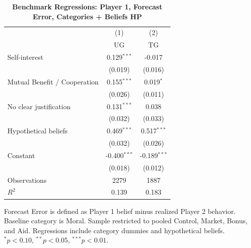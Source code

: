 \begin{table}[!htbp]
\centering
\caption{\textbf{Benchmark Regressions: Player 1, Forecast Error, Categories + Beliefs HP}}
\label{tab:cats_hp_cats_hp_fe_regs}
\begin{tabular}{lcc}
\toprule
 & (1) & (2) \\
 & UG & TG \\
\midrule
Self-interest & 0.129$^{***}$ & -0.017 \\
 & (0.019) & (0.016) \\
Mutual Benefit / Cooperation & 0.155$^{***}$ & 0.019$^{*}$ \\
 & (0.026) & (0.011) \\
No clear justification & 0.131$^{***}$ & 0.038 \\
 & (0.032) & (0.033) \\
Hypothetical beliefs & 0.469$^{***}$ & 0.517$^{***}$ \\
 & (0.032) & (0.026) \\
Constant & -0.400$^{***}$ & -0.189$^{***}$ \\
 & (0.018) & (0.012) \\
\midrule
Observations & 2279 & 1887 \\
$R^2$ & 0.139 & 0.183 \\
\bottomrule
\end{tabular}
\begin{flushleft}
\footnotesize Forecast Error is defined as Player 1 belief minus realized Player 2 behavior. Baseline category is Moral. Sample restricted to pooled Control, Market, Bonus, and Aid. Regressions include category dummies and hypothetical beliefs. $^{*}p<0.10$, $^{**}p<0.05$, $^{***}p<0.01$.
\end{flushleft}
\end{table}

